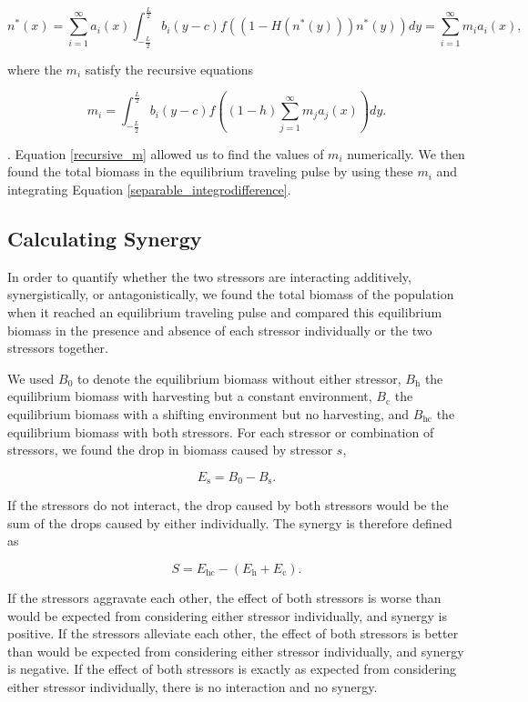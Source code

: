 \documentclass[12pt,english]{article}
\begin{document}
\begin{equation}
n^*(x)=\sum^\infty_{i=1}
a_i(x)\int^{\frac{L}{2}}_{-\frac{L}{2}}b_i(y-c)f((1-H(n^*(y)))n^*(y))dy=\sum^\infty_{i=1}m_ia_i(x), \label{separable_integrodifference}
\end{equation}

\noindent where the $m_i$ satisfy the recursive equations

\begin{equation}
m_i=\int^{\frac{L}{2}}_{-\frac{L}{2}}b_i(y-c)f\left((1-h)\sum^\infty_{j=1}m_ja_j(x)\right)
dy. \label{recursive_m}
\end{equation}

\noindent \citep{Latore:1998fk}. Equation \ref{recursive_m} allowed us to find the values of $m_i$ numerically. We then found the total biomass in the 
equilibrium traveling pulse by using these $m_i$ and integrating Equation \ref{separable_integrodifference}.  

\subsection{Calculating Synergy }

In order to quantify whether the two stressors are interacting additively, synergistically, or antagonistically, we found the total biomass of the population when it reached an equilibrium traveling pulse and 
compared this equilibrium biomass in the presence and absence of each stressor individually or the two stressors together. 

We used $B_0$ to denote the equilibrium biomass 
without either stressor, $B_\text{h}$ the equilibrium biomass with harvesting but a constant environment, $B_\text{c}$ the 
equilibrium biomass with a shifting environment but no harvesting, and $B_\text{hc}$ the equilibrium biomass with 
both stressors. For each stressor or combination of stressors, we found the drop in  biomass caused 
by stressor $s$,

\[E_\text{s}=B_0-B_\text{s}.\]

\noindent If the stressors do not interact, the drop caused by both stressors would be the sum of the drops caused by 
either individually. The synergy is therefore defined as

\[S = E_\text{hc}-\left(E_\text{h}+E_\text{c}\right).\]

\noindent If the stressors aggravate each other, the effect of both stressors is worse than would be expected from 
considering either stressor individually, and synergy is positive. If the stressors alleviate each other, the effect 
of both stressors is better than would be expected from considering either stressor individually, and synergy is 
negative. If the effect of both stressors is exactly as expected from considering either stressor individually, 
there is no interaction and no synergy.
\end{document}
